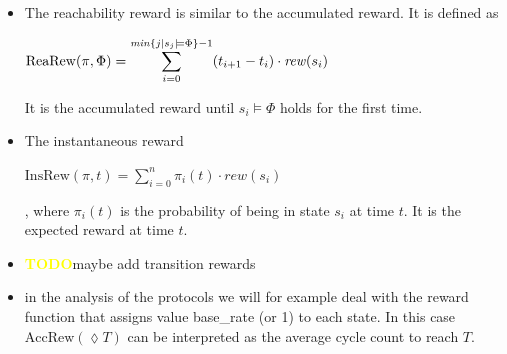 \documentclass[a4paper, 10pt]{article}
\def \todo{\textbf{\textcolor{yellow}{TODO}}}
\begin{document}
\begin{enumerate}
\begin{itemize}
\begin{center}
		\end{center}
	\item The reachability reward is similar to the accumulated reward. It is defined as
		\begin{center}
		$\mathrm{ReaRew}(\pi, \Phi) = \mathlarger{\sum}\limits_{i=0}^{\mathit{min}\{j | s_j \models \Phi\}-1} (t_{i+1} - t_i) \cdot \mathit{rew}(s_i)$
		\end{center}
		It is the accumulated reward until $s_i \models \Phi$ holds for the first time.
	\item The instantaneous reward
		\begin{center}
			$\mathrm{InsRew}(\pi , t) = \sum\limits_{i=0}^{n} \pi_i(t) \cdot rew(s_i)$
		\end{center}
		, where $\pi_i(t)$ is the probability of being in state $s_i$ at time $t$. It is the expected reward at time $t$.
	\item \todo maybe add transition rewards
	\item in the analysis of the protocols we will for example deal with the reward function that assigns value base\_rate (or 1) to each state. In this case $\mathrm{AccRew}(\lozenge T)$ can be interpreted as the average cycle count to reach $T$.
\end{itemize}


\end{enumerate}
\end{document}

